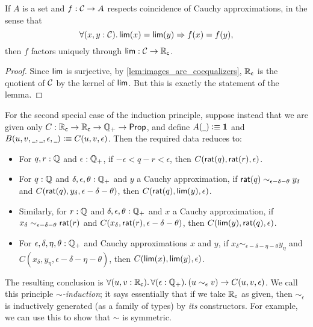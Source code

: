 % 

\begin{lem} \label{RC-lim-factor}
  If $A$ is a set and $f : \mathcal{C} \to A$ respects coincidence of Cauchy approximations, in the sense that
  \begin{equation*}
    \fall{x, y : \CAP} \rclim(x) = \rclim(y) \Rightarrow f(x) = f(y),
  \end{equation*}
  then $f$ factors uniquely through $\mathsf{lim} : \mathcal{C} \to \mathbb{R}_\mathsf{c}$.
\end{lem}
\begin{proof}
  Since $\mathsf{lim}$ is surjective, by \autoref{lem:images_are_coequalizers}, $\mathbb{R}_\mathsf{c}$ is the quotient of $\mathcal{C}$ by the kernel of $\mathsf{lim}$.
  But this is exactly the statement of the lemma.
\end{proof}

For the second special case of the induction principle, suppose instead that we are given only $C:\mathbb{R}_\mathsf{c}\to\mathbb{R}_\mathsf{c}\to\mathbb{Q}_{+}\to\mathsf{Prop}$, and define $A(\mathord{\underline{\hspace{1ex}}})\vcentcolon\equiv\mathbf{1}$ and $B(u,v,\mathord{\underline{\hspace{1ex}}},\mathord{\underline{\hspace{1ex}}},\epsilon,\mathord{\underline{\hspace{1ex}}})\vcentcolon\equiv C(u,v,\epsilon)$.
Then the required data reduces to:
\begin{itemize}
\item For $q,r:\mathbb{Q}$ and $\epsilon:\mathbb{Q}_{+}$, if $-\epsilon < q - r < \epsilon$, then $C(\mathsf{rat}(q),\mathsf{rat}(r),\epsilon)$.
\item For $q:\mathbb{Q}$ and $\delta,\epsilon,\theta:\mathbb{Q}_{+}$ and $y$ a Cauchy approximation, if $\mathsf{rat}(q) \sim_{\epsilon - \delta - \theta} y_\delta$ and
  $C(\mathsf{rat}(q),y_\delta,\epsilon-\delta-\theta)$,
  then $C(\mathsf{rat}(q),\mathsf{lim}(y),\epsilon)$.
\item Similarly, for $r:\mathbb{Q}$ and $\delta,\epsilon,\theta:\mathbb{Q}_{+}$ and $x$ a Cauchy approximation, if $x_\delta \sim_{\epsilon - \delta - \theta} \mathsf{rat}(r)$ and
  $C(x_\delta,\mathsf{rat}(r),\epsilon-\delta-\theta)$,
  then $C(\mathsf{lim}(y),\mathsf{rat}(q),\epsilon)$.
\item For $\epsilon,\delta,\eta,\theta:\mathbb{Q}_{+}$ and Cauchy approximations $x$ and $y$, if $x_\delta \sim_{\epsilon - \delta - \eta - \theta} y_\eta$ and
  $C(x_\delta,y_\eta,{\epsilon - \delta - \eta - \theta})$,
  then $C(\mathsf{lim}(x),\mathsf{lim}(y),\epsilon)$.
\end{itemize}
The resulting conclusion is $\fall{u,v:\RC}{\epsilon:\Qp} (u\sim_\epsilon v) \to C(u,v,\epsilon)$.
We call this principle \emph{$\sim$-induction}; it says essentially that if we take $\mathbb{R}_\mathsf{c}$ as given, then $\sim_\epsilon$ is inductively generated (as a family of types) by \emph{its} constructors.
For example, we can use this to show that $\sim$ is symmetric.

